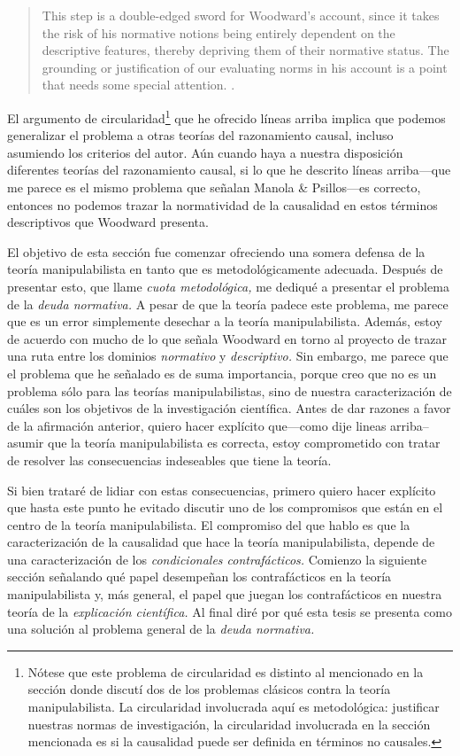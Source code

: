 \begin{quote}
  This step is a double-edged sword for Woodward’s account,
  since it takes the risk of his normative notions being
  entirely dependent on the descriptive features, thereby
  depriving them of their normative status. The grounding or
  justification of our evaluating norms in his account is a
  point that needs some special attention.
  \parencite[p.~305]{Manola2023}.
\end{quote}

El argumento de circularidad\footnote{
  Nótese que este problema de circularidad es distinto al
  mencionado en la sección donde discutí dos de los
  problemas clásicos contra la teoría manipulabilista. La
  circularidad involucrada aquí es metodológica: justificar
  nuestras normas de  investigación, la circularidad
  involucrada en la sección mencionada es si la causalidad
  puede ser definida en términos no causales. 
} 
que he ofrecido líneas arriba implica que podemos
generalizar el problema a otras teorías del razonamiento
causal, incluso asumiendo los criterios del autor. Aún
cuando haya a nuestra disposición diferentes teorías del
razonamiento causal, si lo que he descrito líneas
arriba---que me parece es el mismo problema que señalan
Manola \& Psillos---es correcto, entonces no podemos trazar
la normatividad de la causalidad en estos términos
descriptivos que Woodward presenta. 

El objetivo de esta sección fue comenzar ofreciendo una
somera defensa de la teoría manipulabilista en tanto que es
metodológicamente adecuada. Después de presentar esto, que
llame \emph{cuota metodológica,} me dediqué a presentar el
problema de la \emph{deuda normativa.} A pesar de que la
teoría padece este problema, me parece que es un error
simplemente desechar a la teoría manipulabilista. Además,
estoy de acuerdo con mucho de lo que señala Woodward en
torno al proyecto de trazar una ruta entre los dominios
\emph{normativo} y \emph{descriptivo.} Sin embargo, me
parece que el problema que he señalado es de suma
importancia, porque creo que no es un problema sólo para las
teorías manipulabilistas, sino de nuestra caracterización
de cuáles son los objetivos de la investigación científica.
Antes de dar razones a favor de la afirmación anterior,
quiero hacer explícito que---como dije lineas
arriba--asumir que la teoría manipulabilista es correcta,
estoy comprometido con tratar de resolver las consecuencias
indeseables que tiene la teoría. 

Si bien trataré de lidiar con estas consecuencias, primero
quiero hacer explícito que hasta este punto he evitado
discutir uno de los compromisos que están en el centro de la
teoría manipulabilista. El compromiso del que hablo es que
la caracterización de la causalidad que hace la teoría
manipulabilista, depende de una caracterización de los
\emph{condicionales contrafácticos.} Comienzo la siguiente
sección señalando qué papel desempeñan los contrafácticos en
la teoría manipulabilista y, más general, el papel que
juegan los contrafácticos en nuestra teoría de la
\emph{explicación científica.} Al final diré por qué esta
tesis se presenta como una solución al problema general de 
la \emph{deuda normativa.}


